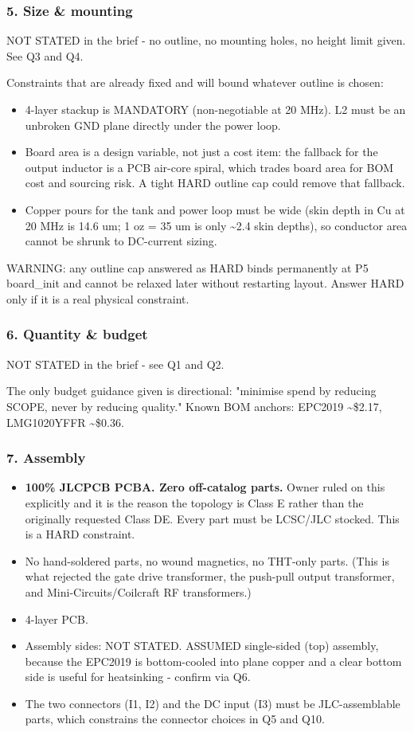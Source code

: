 \documentclass[11pt,a4paper]{article}
\begin{document}
\subsubsection*{5. Size \& mounting}
NOT STATED in the brief - no outline, no mounting holes, no height limit given. See Q3 and Q4.

Constraints that are already fixed and will bound whatever outline is chosen:

\begin{itemize}
\item 4-layer stackup is MANDATORY (non-negotiable at 20 MHz). L2 must be an unbroken GND plane
directly under the power loop.
\item Board area is a design variable, not just a cost item: the fallback for the output inductor is a
PCB air-core spiral, which trades board area for BOM cost and sourcing risk. A tight HARD outline
cap could remove that fallback.
\item Copper pours for the tank and power loop must be wide (skin depth in Cu at 20 MHz is 14.6 um;
1 oz = 35 um is only \textasciitilde{}2.4 skin depths), so conductor area cannot be shrunk to DC-current sizing.
\end{itemize}
WARNING: any outline cap answered as HARD binds permanently at P5 board\_init and cannot be relaxed later without restarting layout. Answer HARD only if it is a real physical constraint.

\subsubsection*{6. Quantity \& budget}
NOT STATED in the brief - see Q1 and Q2.

The only budget guidance given is directional: "minimise spend by reducing SCOPE, never by reducing quality." Known BOM anchors: EPC2019 \textasciitilde{}\$2.17, LMG1020YFFR \textasciitilde{}\$0.36.

\subsubsection*{7. Assembly}
\begin{itemize}
\item \textbf{100\% JLCPCB PCBA. Zero off-catalog parts.} Owner ruled on this explicitly and it is the
reason the topology is Class E rather than the originally requested Class DE. Every part must be
LCSC/JLC stocked. This is a HARD constraint.
\item No hand-soldered parts, no wound magnetics, no THT-only parts. (This is what rejected the gate
drive transformer, the push-pull output transformer, and Mini-Circuits/Coilcraft RF transformers.)
\item 4-layer PCB.
\item Assembly sides: NOT STATED. ASSUMED single-sided (top) assembly, because the EPC2019 is
bottom-cooled into plane copper and a clear bottom side is useful for heatsinking - confirm
via Q6.
\item The two connectors (I1, I2) and the DC input (I3) must be JLC-assemblable parts, which
constrains the connector choices in Q5 and Q10.
\end{itemize}
\end{document}
